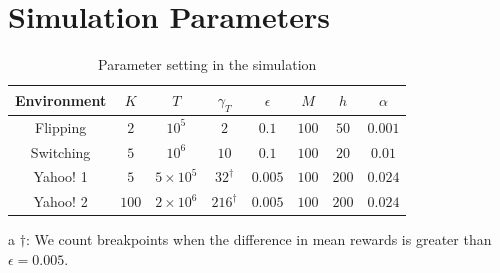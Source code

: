 \documentclass[letterpaper]{article} %
\newcommand{\blue}{}
\begin{document}
\section{Simulation Parameters}\label{app:simul}
\begin{table}[H]
  \centering
  \caption{
  Parameter setting in the simulation
  }
  \label{table:simul}
  \tabcolsep 3pt
\begin{center}
    \begin{tabular}{|c|c|c|c|c|c|c|c|}    
    \hline
   Environment & $K$ & $T$ & $\gamma_T$ & $\epsilon$
    & $M$  & $h$ & $\alpha$\\
    \hline
    Flipping &$2$ & $10^5$ & $2$ & $0.1$
    & $100$ & $50$ & $0.001$\\
    \hline
    Switching &$5$ & $10^6$ & $10$ & $0.1$
    & $100$ & $20$ & $0.01$\\
    \hline
    Yahoo! 1 & $5$& $5\times10^5$ & $32^{\dag}$ & $0.005$
    & $100$ & $200$ & $0.024$\\
    \hline
    Yahoo! 2& $100$ & $2\times10^6$ & $216^{\dag}$ & $0.005$
    & $100$ & $200$ & $0.024$\\
    \hline

  \end{tabular}
\end{center}
  \begin{tablenotes}
	\item[a] $\dag$: {\blue We count breakpoints when the difference in
          mean rewards is greater than $\epsilon=0.005$.}
  \end{tablenotes}
\end{table}
\end{document}
